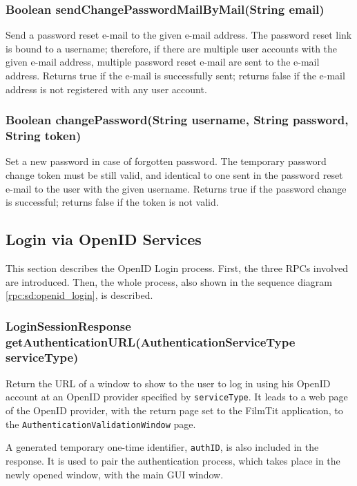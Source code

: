 \subsubsection{Boolean sendChangePasswordMailByMail(String email)}
Send a password reset e-mail to the given e-mail address.
The password reset link is bound to a username;
therefore, if there are multiple user accounts with the given e-mail address,
multiple password reset e-mail are sent to the e-mail address.
Returns true if the e-mail is successfully sent;
returns false if the e-mail address is not registered with any user account.

\subsubsection{Boolean changePassword(String username, String password, String token)}
\label{sec:rpc_changePassword}
Set a new password in case of forgotten password.
The temporary password change token must be still valid,
and identical to one sent in the password reset e-mail
to the user with the given username.
Returns true if the password change is successful;
returns false if the token is not valid.

\subsection{Login via OpenID Services}
\label{subsubsec:gui_openid}

This section describes the OpenID Login process. First, the three RPCs involved are introduced. Then, the whole process, also shown in the sequence diagram \ref{rpc:sd:openid_login}, is described.

\subsubsection{LoginSessionResponse getAuthenticationURL(AuthenticationServiceType serviceType)}
\label{sec:rpc_getAuthenticationURL}

Return the URL of a window to show to the user to log in using his OpenID account at an OpenID provider specified by {\tt serviceType}. It leads to a web page of the OpenID provider, with the return page set to the FilmTit application, to the {\tt AuthenticationValidationWindow} page.

A generated temporary one-time identifier, {\tt authID}, is also included in the response. It is used to pair the authentication process, which takes place in the newly opened window, with the main GUI window.


